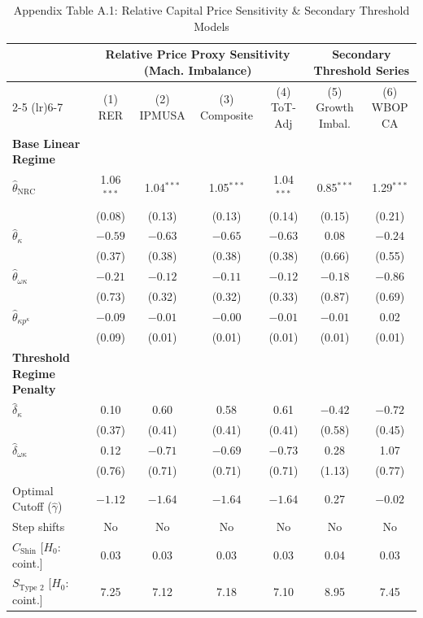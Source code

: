 \begin{table}[htbp]
	\centering
	\caption{Appendix Table A.1: Relative Capital Price Sensitivity \& Secondary Threshold Models}
	\label{tab:chile_threshold_imols_appendix}
	\small
	\begin{tabular}{@{}lcccccc@{}}
		\toprule
		& \multicolumn{4}{c}{Relative Price Proxy Sensitivity (Mach. Imbalance)} & \multicolumn{2}{c}{Secondary Threshold Series} \\
		\cmidrule(lr){2-5} \cmidrule(lr){6-7}
		& (1) RER & (2) IPMUSA & (3) Composite & (4) ToT-Adj & (5) Growth Imbal. & (6) WBOP CA \\
		\midrule
		\textbf{Base Linear Regime} & & & & & & \\
		$\hat{\theta}_{\text{NRC}}$ & 1.06$^{***}$ & 1.04$^{***}$ & 1.05$^{***}$ & 1.04$^{***}$ & 0.85$^{***}$ & 1.29$^{***}$ \\
		& (0.08) & (0.13) & (0.13) & (0.14) & (0.15) & (0.21) \\
		$\hat{\theta}_{\kappa}$ & $-0.59$ & $-0.63$ & $-0.65$ & $-0.63$ & 0.08 & $-0.24$ \\
		& (0.37) & (0.38) & (0.38) & (0.38) & (0.66) & (0.55) \\
		$\hat{\theta}_{\omega\kappa}$ & $-0.21$ & $-0.12$ & $-0.11$ & $-0.12$ & $-0.18$ & $-0.86$ \\
		& (0.73) & (0.32) & (0.32) & (0.33) & (0.87) & (0.69) \\
		$\hat{\theta}_{\kappa p^\kappa}$ & $-0.09$ & $-0.01$ & $-0.00$ & $-0.01$ & $-0.01$ & 0.02 \\
		& (0.09) & (0.01) & (0.01) & (0.01) & (0.01) & (0.01) \\
		\midrule
		\textbf{Threshold Regime Penalty} & & & & & & \\
		$\hat{\delta}_{\kappa}$ & 0.10 & 0.60 & 0.58 & 0.61 & $-0.42$ & $-0.72$ \\
		& (0.37) & (0.41) & (0.41) & (0.41) & (0.58) & (0.45) \\
		$\hat{\delta}_{\omega\kappa}$ & 0.12 & $-0.71$ & $-0.69$ & $-0.73$ & 0.28 & 1.07 \\
		& (0.76) & (0.71) & (0.71) & (0.71) & (1.13) & (0.77) \\
		\midrule
		Optimal Cutoff ($\hat{\gamma}$) & $-1.12$ & $-1.64$ & $-1.64$ & $-1.64$ & 0.27 & $-0.02$ \\
		Step shifts & No & No & No & No & No & No \\
		$C_{\text{Shin}}$ [$H_0$: coint.] & 0.03 & 0.03 & 0.03 & 0.03 & 0.04 & 0.03 \\
		$S_{\text{Type 2}}$ [$H_0$: coint.] & 7.25 & 7.12 & 7.18 & 7.10 & 8.95 & 7.45 \\

\end{tabular}
\end{table}
